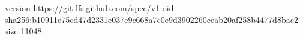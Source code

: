 version https://git-lfs.github.com/spec/v1
oid sha256:b10911e75cd47d2331e037e9c668a7c0e9d3902260ceab20af258b4477d8bac2
size 11048
